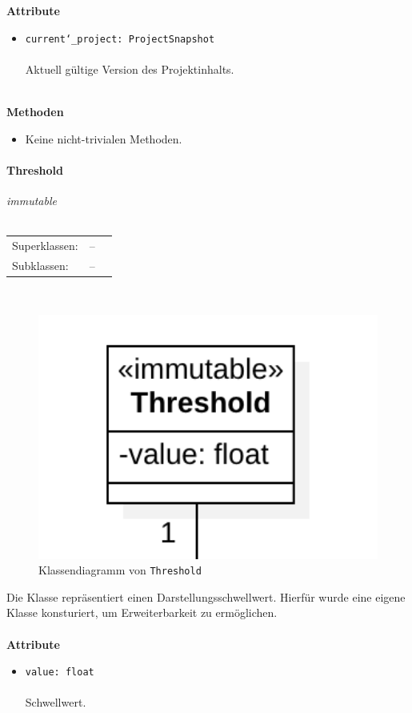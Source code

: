 \documentclass{article}
\newcommand{\classheader}[2][]{\paragraph{#2}
\mbox{}\textit{#1}\\\\}
\begin{document}
\textbf{Attribute}
\begin{itemize}\setlength\itemsep{3em}
\item \texttt{current\char`_project: ProjectSnapshot}\\\\
Aktuell gültige Version des Projektinhalts.
\\\\
\end{itemize}

\textbf{Methoden}
\begin{itemize}\setlength\itemsep{3em}
\item[] Keine nicht-trivialen Methoden.
\end{itemize}

\newpage
\classheader[\flqq{}immutable\frqq]{Threshold}\label{cls:Threshold}
\begin{tabular}{lll}
 Superklassen: & --\\
 Subklassen: & --
\end{tabular}\\
\begin{figure}[H]%
    \centering
    \includegraphics[width=13cm]{entwurf/Entwurf_dokument/img/cls/model/Threshold.png}
    \caption{Klassendiagramm von \texttt{Threshold}}
\end{figure}

Die Klasse repräsentiert einen Darstellungsschwellwert. Hierfür wurde eine eigene Klasse konsturiert, um Erweiterbarkeit zu ermöglichen.
\\\\

\textbf{Attribute}
\begin{itemize}\setlength\itemsep{3em}
\item \texttt{value: float}\\\\
Schwellwert.
\\\\
\end{itemize}
\end{document}

